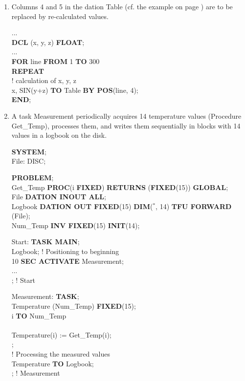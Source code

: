 \begin{enumerate}
\item Columns 4 and 5 in the dation Table (cf. the example on page
\pageref{Example}) are to be replaced by re-calculated values.

...\\
{\bf DCL} (x, y, z) {\bf FLOAT};\\
...\\
{\bf FOR} line {\bf FROM} 1 {\bf TO} 300\\
{\bf REPEAT}\\
\x ! calculation of x, y, z\\
 x, SIN(y+z) {\bf TO} Table {\bf BY POS}(line, 4);\\
{\bf END};

\item A task Measurement periodically acquires 14 temperature values
(Procedure Get\_Temp), processes them, and writes them sequentially in
blocks with 14 values in a logbook on the disk.

{\bf SYSTEM};\\
\x File: DISC;

{\bf PROBLEM};\\
 Get\_Temp {\bf PROC}(i {\bf FIXED}) {\bf RETURNS} ({\bf FIXED}(15)) {\bf GLOBAL};\\
 File {\bf DATION INOUT  ALL};\\
 Logbook {\bf DATION OUT FIXED}(15) {\bf DIM}($^*$, 14) {\bf TFU FORWARD}\\
\x {} (File);\\
 Num\_Temp {\bf INV FIXED}(15) {\bf INIT}(14);

Start: {\bf TASK MAIN};\\
 Logbook; \x ! Positioning to beginning\\
 10 {\bf SEC ACTIVATE} Measurement;\\
\x ... \\
; ! Start

Measurement: {\bf TASK};\\
 Temperature (Num\_Temp) {\bf FIXED}(15); \\
 i {\bf TO} Num\_Temp\\
\\
\x \x Temperature(i) := Get\_Temp(i);\\
;\\
\x ! Processing the measured values\\
 Temperature {\bf TO} Logbook; \\
; ! Measurement
\end{enumerate}

